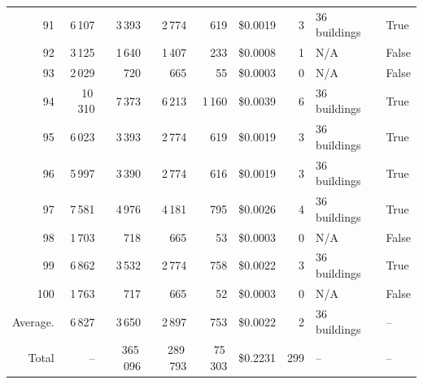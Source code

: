 \documentclass[a4paper,11pt]{article}
\begin{document}
\begin{table}[ht]
\begin{tabular}{r r r r r r r p{3cm} l}
91 & 6\,107 & 3\,393 & 2\,774 & 619 & \$0.0019 & 3 & 36 buildings & True \\
92 & 3\,125 & 1\,640 & 1\,407 & 233 & \$0.0008 & 1 & N/A & False \\
93 & 2\,029 & 720 & 665 & 55 & \$0.0003 & 0 & N/A & False \\
94 & 10\,310 & 7\,373 & 6\,213 & 1\,160 & \$0.0039 & 6 & 36 buildings & True \\
95 & 6\,023 & 3\,393 & 2\,774 & 619 & \$0.0019 & 3 & 36 buildings & True \\
96 & 5\,997 & 3\,390 & 2\,774 & 616 & \$0.0019 & 3 & 36 buildings & True \\
97 & 7\,581 & 4\,976 & 4\,181 & 795 & \$0.0026 & 4 & 36 buildings & True \\
98 & 1\,703 & 718 & 665 & 53 & \$0.0003 & 0 & N/A & False \\
99 & 6\,862 & 3\,532 & 2\,774 & 758 & \$0.0022 & 3 & 36 buildings & True \\
100 & 1\,763 & 717 & 665 & 52 & \$0.0003 & 0 & N/A & False \\
\hline
Average. & 6\,827 & 3\,650 & 2\,897 & 753 & \$0.0022 & 2 & 36 buildings & -- \\
Total & -- & 365\,096 & 289\,793 & 75\,303 & \$0.2231 & 299 & -- & -- \\
\hline
\end{tabular}
\end{table}

\clearpage
\end{document}
